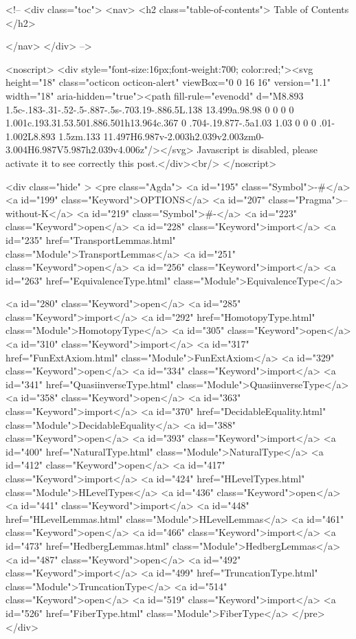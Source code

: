   <!-- 
  <div class="toc">
    <nav>
    <h2 class="table-of-contents"> Table of Contents </h2>
      

    </nav>
  </div>
   -->

  <noscript>
  <div style="font-size:16px;font-weight:700; color:red;"><svg height="18" class="octicon octicon-alert" viewBox="0 0 16 16" version="1.1" width="18" aria-hidden="true"><path fill-rule="evenodd" d="M8.893 1.5c-.183-.31-.52-.5-.887-.5s-.703.19-.886.5L.138 13.499a.98.98 0 0 0 0 1.001c.193.31.53.501.886.501h13.964c.367 0 .704-.19.877-.5a1.03 1.03 0 0 0 .01-1.002L8.893 1.5zm.133 11.497H6.987v-2.003h2.039v2.003zm0-3.004H6.987V5.987h2.039v4.006z"/></svg> Javascript is disabled, please activate it to see correctly this post.</div><br/>
  </noscript>

  <div class="hide" >
<pre class="Agda">
<a id="195" class="Symbol">{-#</a> <a id="199" class="Keyword">OPTIONS</a> <a id="207" class="Pragma">--without-K</a> <a id="219" class="Symbol">#-}</a>
<a id="223" class="Keyword">open</a> <a id="228" class="Keyword">import</a> <a id="235" href="TransportLemmas.html" class="Module">TransportLemmas</a>
<a id="251" class="Keyword">open</a> <a id="256" class="Keyword">import</a> <a id="263" href="EquivalenceType.html" class="Module">EquivalenceType</a>

<a id="280" class="Keyword">open</a> <a id="285" class="Keyword">import</a> <a id="292" href="HomotopyType.html" class="Module">HomotopyType</a>
<a id="305" class="Keyword">open</a> <a id="310" class="Keyword">import</a> <a id="317" href="FunExtAxiom.html" class="Module">FunExtAxiom</a>
<a id="329" class="Keyword">open</a> <a id="334" class="Keyword">import</a> <a id="341" href="QuasiinverseType.html" class="Module">QuasiinverseType</a>
<a id="358" class="Keyword">open</a> <a id="363" class="Keyword">import</a> <a id="370" href="DecidableEquality.html" class="Module">DecidableEquality</a>
<a id="388" class="Keyword">open</a> <a id="393" class="Keyword">import</a> <a id="400" href="NaturalType.html" class="Module">NaturalType</a>
<a id="412" class="Keyword">open</a> <a id="417" class="Keyword">import</a> <a id="424" href="HLevelTypes.html" class="Module">HLevelTypes</a>
<a id="436" class="Keyword">open</a> <a id="441" class="Keyword">import</a> <a id="448" href="HLevelLemmas.html" class="Module">HLevelLemmas</a>
<a id="461" class="Keyword">open</a> <a id="466" class="Keyword">import</a> <a id="473" href="HedbergLemmas.html" class="Module">HedbergLemmas</a>
<a id="487" class="Keyword">open</a> <a id="492" class="Keyword">import</a> <a id="499" href="TruncationType.html" class="Module">TruncationType</a>
<a id="514" class="Keyword">open</a> <a id="519" class="Keyword">import</a> <a id="526" href="FiberType.html" class="Module">FiberType</a>
</pre>
</div>

